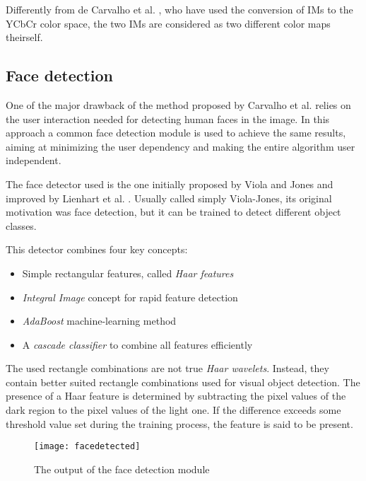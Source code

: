 Differently from de Carvalho et al. \cite{carvalho2016illuminant}, who have used the conversion of IMs to the YCbCr color space, the two IMs are considered as two different color maps theirself.

\subsection{Face detection}

One of the major drawback of the method proposed by Carvalho et al. \cite{carvalho2016illuminant} relies on the user interaction needed for detecting human faces in the image. In this approach a common face detection module is used to achieve the same results, aiming at minimizing the user dependency and making the entire algorithm user independent.

The face detector used is the one initially proposed by Viola and Jones \cite{viola2001rapid}\cite{viola2004robust} and improved by  Lienhart et al. \cite{lienhart2002extended}. Usually called simply Viola-Jones, its original motivation was face detection, but it can be trained to detect different object classes. 

This detector combines four key concepts: 
\begin{itemize}
\item Simple rectangular features, called \emph{Haar features}
\item \emph{Integral Image}\cite{crow1984summed} concept for rapid feature detection 
\item \emph{AdaBoost}\cite{freund1995desicion} machine-learning method 
\item A \emph{cascade classifier} to combine all features efficiently 
\end{itemize}

The used rectangle combinations are not true \emph{Haar wavelets}\cite{haar1910theorie}. Instead, they contain better suited rectangle combinations used for visual object detection. The presence of a Haar feature is determined by subtracting the pixel values of the dark region to the pixel values of the light one. If the difference exceeds some threshold value set during the training process, the feature is said to be present. 

\begin{figure}[h!]
  \centering
    \texttt{[image: facedetected]}
    \caption{The output of the face detection module}
    \label{fig:facesdetected}
\end{figure}

